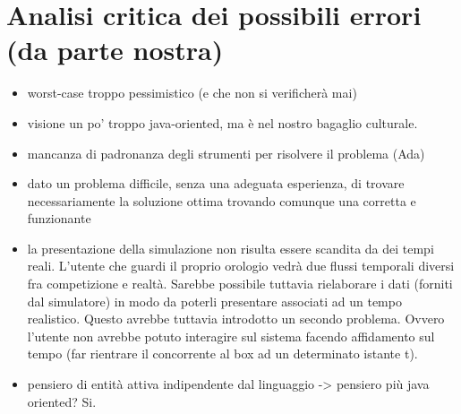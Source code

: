 \section{Analisi critica dei possibili errori (da parte nostra)}
\begin{itemize}
\item worst-case troppo pessimistico (e che non si verificherà mai)
\item visione un po’ troppo java-oriented, ma è nel nostro bagaglio culturale.
\item mancanza di padronanza degli strumenti per risolvere il problema (Ada)
\item dato un problema difficile, senza una adeguata esperienza, di trovare necessariamente la soluzione ottima trovando comunque una corretta e funzionante
\item la presentazione della simulazione non risulta essere scandita da dei tempi reali. L’utente che guardi il proprio orologio vedrà due flussi temporali diversi fra competizione e realtà. Sarebbe possibile tuttavia rielaborare i dati (forniti dal simulatore) in modo da poterli presentare associati ad un tempo realistico. Questo avrebbe tuttavia introdotto un secondo problema. Ovvero l’utente non avrebbe potuto interagire sul sistema facendo affidamento sul tempo (far rientrare il concorrente al box ad un determinato istante t).
\item pensiero di entità attiva indipendente dal linguaggio -> pensiero più java oriented? Si.

\end{itemize}
